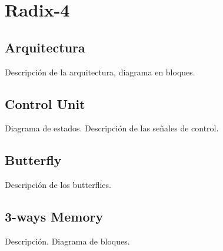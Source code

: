 \section{Radix-4}
\subsection{Arquitectura} 
Descripción de la arquitectura, diagrama en bloques.
\subsection{Control Unit}
Diagrama de estados. Descripción de las señales de control.
\subsection{Butterfly}
Descripción de los butterflies.
\subsection{3-ways Memory}
Descripción. Diagrama de bloques.